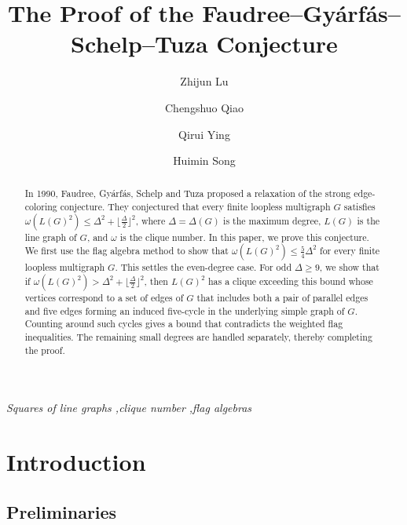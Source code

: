 \documentclass[preprint,11pt,numbers]{elsarticle-arxiv}
\numberwithin{equation}{section}
\theoremstyle{definition}
\newcommand{\papertitle}{The Proof of the Faudree--Gy\'arf\'as--Schelp--Tuza Conjecture}
\begin{document}

\begin{frontmatter}
\title{\textbf{\Large\papertitle}}
\author[1]{Zhijun Lu}
\author[1]{Chengshuo Qiao}
\author[1]{Qirui Ying}
\author[1]{Huimin Song}

\begin{abstract}
In 1990, Faudree, Gy\'arf\'as, Schelp and Tuza proposed a relaxation
of the strong edge-coloring conjecture. They conjectured that every
finite loopless multigraph $G$ satisfies
$\omega(L(G)^2)\leq\Delta^2+\lfloor\frac{\Delta}{2}\rfloor^2$, where
$\Delta=\Delta(G)$ is the maximum degree, $L(G)$ is the line graph
of $G$, and $\omega$ is the clique number. In this paper, we prove this conjecture. We first use the flag algebra
method to show that $\omega(L(G)^2)\leq\frac{5}{4}\Delta^2$ for every
finite loopless multigraph $G$. This settles the even-degree case.
For odd $\Delta\geq 9$, we show that if
$\omega(L(G)^2)>\Delta^2+\lfloor\frac{\Delta}{2}\rfloor^2$,
then $L(G)^2$ has a clique exceeding this bound whose vertices
correspond to a set of edges of $G$ that includes both a pair of
parallel edges and five edges forming an induced five-cycle in the
underlying simple graph of $G$. Counting around such cycles gives a
bound that contradicts the weighted flag inequalities. The remaining
small degrees are handled separately, thereby completing the proof.
\end{abstract}
\begin{keyword}
\textit{Squares of line graphs \sep clique number \sep flag algebras}
\end{keyword}
\end{frontmatter}

\thispagestyle{plain}
\tableofcontents
\clearpage
\section{Introduction}\label{sec:intro}

\subsection{Preliminaries}\label{sec:prelim}
\end{document}
